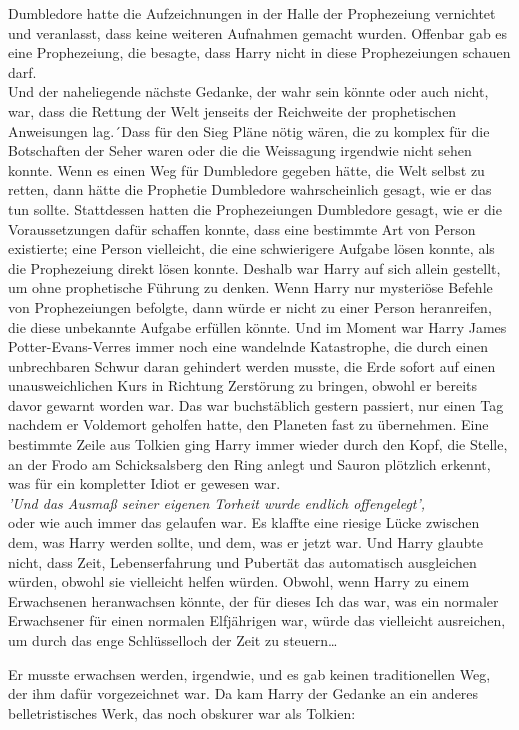 {Dumbledore hatte die Aufzeichnungen in der Halle der Prophezeiung vernichtet und veranlasst, dass keine weiteren Aufnahmen gemacht wurden. Offenbar gab es eine Prophezeiung, die besagte, dass Harry nicht in diese Prophezeiungen schauen darf.\\ Und der naheliegende nächste Gedanke, der wahr sein könnte oder auch nicht, war, dass die Rettung der Welt jenseits der Reichweite der prophetischen Anweisungen lag.´Dass für den Sieg Pläne nötig wären, die zu komplex für die Botschaften der Seher waren oder die die Weissagung irgendwie nicht sehen konnte. Wenn es einen Weg für Dumbledore gegeben hätte, die Welt selbst zu retten, dann hätte die Prophetie Dumbledore wahrscheinlich gesagt, wie er das tun sollte. Stattdessen hatten die Prophezeiungen Dumbledore gesagt, wie er die Voraussetzungen dafür schaffen konnte, dass eine bestimmte Art von Person existierte; eine Person vielleicht, die eine schwierigere Aufgabe lösen konnte, als die Prophezeiung direkt lösen konnte. Deshalb war Harry auf sich allein gestellt, um ohne prophetische Führung zu denken. Wenn Harry nur mysteriöse Befehle von Prophezeiungen befolgte, dann würde er nicht zu einer Person heranreifen, die diese unbekannte Aufgabe erfüllen könnte. Und im Moment war Harry James Potter-Evans-Verres immer noch eine wandelnde Katastrophe, die durch einen unbrechbaren Schwur daran gehindert werden musste, die Erde sofort auf einen unausweichlichen Kurs in Richtung Zerstörung zu bringen, obwohl er bereits davor gewarnt worden war. Das war buchstäblich gestern passiert, nur einen Tag nachdem er Voldemort geholfen hatte, den Planeten fast zu übernehmen. Eine bestimmte Zeile aus Tolkien ging Harry immer wieder durch den Kopf, die Stelle, an der Frodo am Schicksalsberg den Ring anlegt und Sauron plötzlich erkennt, was für ein kompletter Idiot er gewesen war.\\ \emph{'Und das Ausmaß seiner eigenen Torheit wurde endlich offengelegt',}\\ oder wie auch immer das gelaufen war. Es klaffte eine riesige Lücke zwischen dem, was Harry werden sollte, und dem, was er jetzt war. Und Harry glaubte nicht, dass Zeit, Lebenserfahrung und Pubertät das automatisch ausgleichen würden, obwohl sie vielleicht helfen würden. Obwohl, wenn Harry zu einem Erwachsenen heranwachsen könnte, der für dieses Ich das war, was ein normaler Erwachsener für einen normalen Elfjährigen war, würde das vielleicht ausreichen, um durch das enge Schlüsselloch der Zeit zu steuern…

Er musste erwachsen werden, irgendwie, und es gab keinen traditionellen Weg, der ihm dafür vorgezeichnet war. Da kam Harry der Gedanke an ein anderes belletristisches Werk, das noch obskurer war als Tolkien:

}
